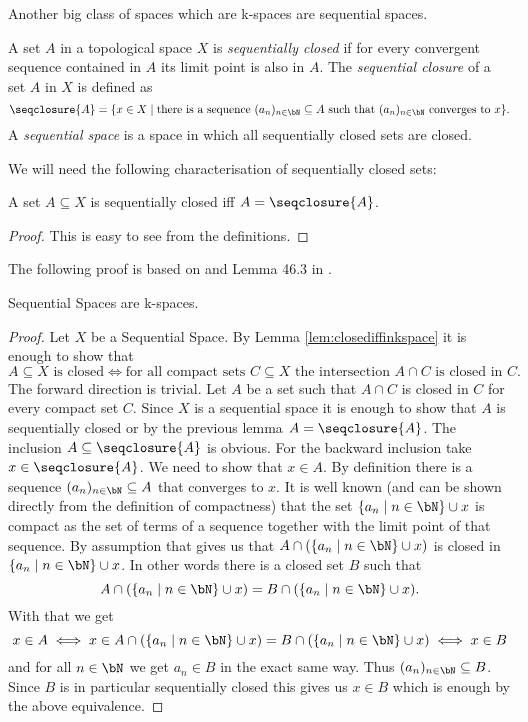 Another big class of spaces which are k-spaces are sequential spaces. 

\begin{defi}
    A set $A$ in a topological space $X$ is \emph{sequentially closed} if for every convergent sequence contained in $A$ its limit point is also in $A$. 
    The \emph{sequential closure} of a set $A$ in $X$ is defined as 
    \[\seqclosure{A} = \{ x \in X \mid \text{there is a sequence } (a_n)_{n \in \bN} \subseteq A \text{ such that } (a_n)_{n \in \bN} \text{ converges to } x\}.\]
    A \emph{sequential space} is a space in which all sequentially closed sets are closed.
\end{defi}

We will need the following characterisation of sequentially closed sets: 

\begin{lem}
    A set $A \subseteq X$ is sequentially closed iff $A = \seqclosure{A}$.
\end{lem}
\begin{proof}
    This is easy to see from the definitions.
\end{proof}

The following proof is based on \cite{Scott2016} and Lemma 46.3 in \cite{Munkres2014}. 

\begin{lem} \label{lem:sequentialiskspace}
    Sequential Spaces are k-spaces.
\end{lem}
\begin{proof}
    Let $X$ be a Sequential Space. 
    By Lemma \ref{lem:closediffinkspace} it is enough to show that 
    \[A \subseteq X \text{ is closed} \iff \text{for all compact sets } C \subseteq X \text{ the intersection } A \cap C \text{ is closed in } C.\]
    The forward direction is trivial.
    Let $A$ be a set such that $A \cap C$ is closed in $C$ for every compact set $C$. 
    Since $X$ is a sequential space it is enough to show that $A$ is sequentially closed or by the previous lemma $A  = \seqclosure{A}$.
    The inclusion $A \subseteq \seqclosure{A}$ is obvious. 
    For the backward inclusion take $x \in \seqclosure{A}$. 
    We need to show that $x \in A$.
    By definition there is a sequence $(a_n)_{n \in \bN} \subseteq A$ that converges to $x$. 
    It is well known (and can be shown directly from the definition of compactness) that the set $\{a_n \mid n \in \bN\} \cup {x}$ is compact as the set of terms of a sequence together with the limit point of that sequence.
    By assumption that gives us that $A \cap (\{a_n \mid n \in \bN\} \cup {x})$ is closed in $\{a_n \mid n \in \bN\} \cup {x}$. 
    In other words there is a closed set $B$ such that 
    \[A \cap (\{a_n \mid n \in \bN\} \cup {x}) = B \cap (\{a_n \mid n \in \bN\} \cup {x}).\]
    With that we get
    \[x \in A \iff x \in A \cap (\{a_n \mid n \in \bN\} \cup {x}) = B \cap (\{a_n \mid n \in \bN\} \cup {x}) \iff x \in B\]
    and for all $n \in \bN$ we get $a_n \in B$ in the exact same way. 
    Thus $(a_n)_{n \in \bN} \subseteq B$.
    Since $B$ is in particular sequentially closed this gives us $x \in B$ which is enough by the above equivalence.
\end{proof}

